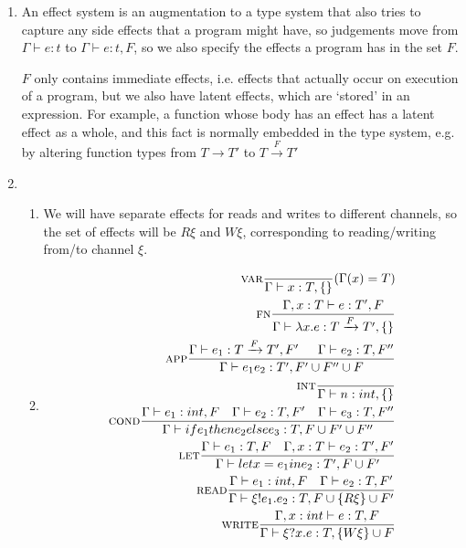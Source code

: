 


\begin{enumerate}[label=(\alph*)]
  \item
    An effect system is an augmentation to a type system that also tries to capture any side effects that a program might have, so judgements move from $\Gamma \vdash e : t$ to $\Gamma \vdash e : t, F$, so we also specify the effects a program has in the set $F$.

    $F$ only contains immediate effects, i.e. effects that actually occur on execution of a program, but we also have latent effects, which are `stored' in an expression. For example, a function whose body has an effect has a latent effect as a whole, and this fact is normally embedded in the type system, e.g. by altering function types from $T \rightarrow T'$ to $T \xrightarrow{F} T'$

  \item
    \begin{enumerate}[label=(\roman*)]
      \item
        We will have separate effects for reads and writes to different channels, so the set of effects will be $R\xi$ and $W\xi$, corresponding to reading/writing from/to channel $\xi$.

      \item
        \begin{align*}
          \textsc{var}\frac{}{\Gamma \vdash x : T, \{\}}(\Gamma(x) = T)\\
          \textsc{fn}\frac{\Gamma, x : T \vdash e : T', F}{\Gamma \vdash \lambda x. e : T \xrightarrow{F}T', \{\}}\\
          \textsc{app}\frac{\Gamma \vdash e_1 : T \xrightarrow{F}T', F'\hspace{15pt}\Gamma \vdash e_2 : T, F''}{\Gamma \vdash e_1 e_2 : T', F' \cup F'' \cup F}\\
          \textsc{int}\frac{}{\Gamma \vdash n : int, \{\}}\\
          \textsc{cond}\frac{\Gamma \vdash e_1 : int, F \hspace{10pt} \Gamma \vdash e_2 : T, F' \hspace{10pt}\Gamma \vdash e_3 : T, F''}{\Gamma \vdash if e_1 then e_2 else e_3 : T, F \cup F' \cup F''}\\
          \textsc{let}\frac{\Gamma \vdash e_1 : T, F \hspace{10pt} \Gamma, x : T \vdash e_2 : T', F'}{\Gamma \vdash let x = e_1 in e_2 : T', F \cup F'}\\
          \textsc{read}\frac{\Gamma \vdash e_1 : int, F \hspace{10pt}\Gamma \vdash e_2 : T, F'}{\Gamma \vdash \xi!e_1.e_2 : T, F \cup \{R\xi\} \cup F'}\\
          \textsc{write}\frac{\Gamma, x : int \vdash e : T, F}{\Gamma \vdash \xi?x.e : T, \{W\xi\} \cup F}\\
        \end{align*}


\end{enumerate}
\end{enumerate}
